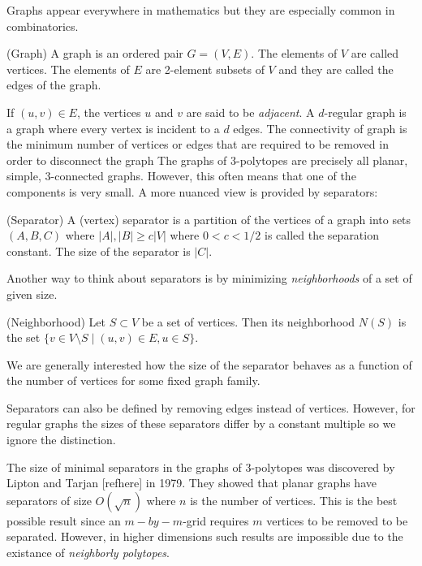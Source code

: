 Graphs appear everywhere in mathematics but they are especially common in 
combinatorics. 

\begin{definition}
(Graph) A graph is an ordered pair $G=(V,E)$. The elements of $V$ are called 
vertices. The elements of $E$ are 2-element subsets of $V$ and they are called 
the edges of the graph. 
\end{definition}

If $(u,v) \in E$, the vertices $u$ and $v$ are said to be \textit{adjacent}.
A $d$-regular graph is a graph where every vertex is incident to a $d$ edges.
The connectivity of graph is the minimum number of vertices or edges that are 
required to be removed in order to disconnect the graph The graphs of 
3-polytopes are precisely all planar, simple, 3-connected graphs. However, this 
often means that one of the components is very small. A more nuanced view is 
provided 
by separators:

\begin{definition}
(Separator) A (vertex) separator is a partition of the vertices of a graph into 
sets $(A,B,C)$ where $|A|, |B| \geq c|V|$ where $0<c<1/2$ is called the 
separation 
constant. The size of the separator is $|C|$.  
\end{definition}

Another way to think about separators is by minimizing \textit{neighborhoods} 
of a set of given size.

\begin{definition}
 (Neighborhood) Let $S \subset V$ be a set of vertices. Then its neighborhood 
$N(S)$ is the set $\{v \in V\setminus S \mid (u,v) \in E, u \in S\}$. 
\end{definition}

We are generally interested how the size of the separator behaves as a function 
of the number of vertices for some fixed graph family.

Separators can also be defined by removing edges instead of vertices. However, 
for regular graphs the sizes of these separators differ by a constant multiple 
so we ignore the distinction.

The size of minimal separators in the graphs of 3-polytopes was discovered by 
Lipton and Tarjan [refhere] in 1979. They showed that planar graphs have 
separators of size $O(\sqrt{n})$ where $n$ is the number of vertices. This is 
the best possible result since an $m-by-m$-grid requires $m$ vertices to be 
removed to be separated. However, in higher dimensions such results are 
impossible due to the existance of \textit{neighborly polytopes}.

